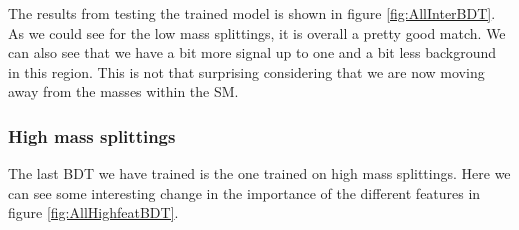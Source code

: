 The results from testing the trained model is shown in figure \ref{fig:AllInterBDT}. As we could see for the low mass splittings, it is overall a pretty good match. We can also see that we have a bit more signal up to one and a bit less background in this region. This is not that surprising considering that we are now moving away from the masses within the SM. 
















\subsubsection{High mass splittings}

The last BDT we have trained is the one trained on high mass splittings. Here we can see some interesting change in the importance of the different features in figure \ref{fig:AllHighfeatBDT}.

